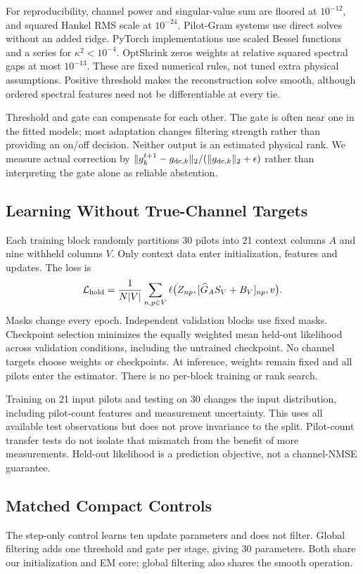 \documentclass[10pt,journal,letterpaper]{IEEEtran}
\begin{document}
For reproducibility, channel power and singular-value sum are floored at $10^{-12}$, and squared Hankel RMS scale at $10^{-24}$. Pilot-Gram systems use direct solves without an added ridge. PyTorch implementations use scaled Bessel functions and a series for $\kappa^2<10^{-4}$. OptShrink zeros weights at relative squared spectral gaps at most $10^{-13}$. These are fixed numerical rules, not tuned extra physical assumptions. Positive threshold makes the reconstruction solve smooth, although ordered spectral features need not be differentiable at every tie.

Threshold and gate can compensate for each other. The gate is often near one in the fitted models; most adaptation changes filtering strength rather than providing an on/off decision. Neither output is an estimated physical rank. We measure actual correction by $\|g_k^{t+1}-g_{{\rm dc},k}\|_2/(\|g_{{\rm dc},k}\|_2+\epsilon)$ rather than interpreting the gate alone as reliable abstention.

\subsection{Learning Without True-Channel Targets}
Each training block randomly partitions 30 pilots into 21 context columns $A$ and nine withheld columns $V$. Only context data enter initialization, features and updates. The loss is
\begin{equation}
 \mathcal L_{\rm hold}=\frac{1}{N|V|}\sum_{n,p\in V}
 \ell\big(Z_{np},[\widehat G_A S_V+B_V]_{np},v\big).
\end{equation}
Masks change every epoch. Independent validation blocks use fixed masks. Checkpoint selection minimizes the equally weighted mean held-out likelihood across validation conditions, including the untrained checkpoint. No channel targets choose weights or checkpoints. At inference, weights remain fixed and all pilots enter the estimator. There is no per-block training or rank search.

Training on 21 input pilots and testing on 30 changes the input distribution, including pilot-count features and measurement uncertainty. This uses all available test observations but does not prove invariance to the split. Pilot-count transfer tests do not isolate that mismatch from the benefit of more measurements. Held-out likelihood is a prediction objective, not a channel-NMSE guarantee.

\subsection{Matched Compact Controls}
The step-only control learns ten update parameters and does not filter. Global filtering adds one threshold and gate per stage, giving 30 parameters. Both share our initialization and EM core; global filtering also shares the smooth operation.
\end{document}
